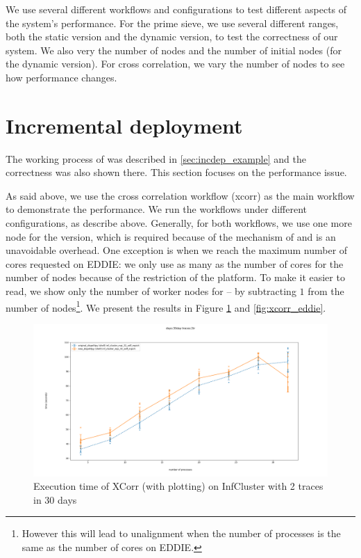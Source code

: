 We use several different workflows and configurations to test different aspects of the system's performance. For the prime sieve, we use several different ranges, both the static version and the dynamic version, to test the correctness of our system. We also very the number of nodes and the number of initial nodes (for the dynamic version). For cross correlation, we vary the number of nodes to see how performance changes.

\section{Incremental deployment}
The working process of \tincdep was described in \ref{sec:incdep_example} and the correctness was also shown there. This section focuses on the performance issue.

As said above, we use the cross correlation workflow (xcorr) as the main workflow to demonstrate the performance. We run the workflows under different configurations, as describe above. Generally, for both workflows, we use one more node for the \tincdep version, which is required because of the mechanism of \tincdep and is an unavoidable overhead. One exception is when we reach the maximum number of cores requested on EDDIE: we only use as many as the number of cores for the number of nodes because of the restriction of the platform. To make it easier to read, we show only the number of worker nodes for \tincdep -- by subtracting $1$ from the number of nodes\footnote{However this will lead to unalignment when the number of processes is the same  as the number of cores on EDDIE.}. We present the results in Figure \ref{fig:xcorr_infcluster} and \ref{fig:xcorr_eddie}.

\begin{figure}[h]
\centering
    \includegraphics[width=1\textwidth]{figures/xcorr_infcluster_30day_2tr}
\caption{Execution time of XCorr (with plotting) on InfCluster with 2 traces in 30 days}
\label{fig:xcorr_infcluster}
\end{figure}

